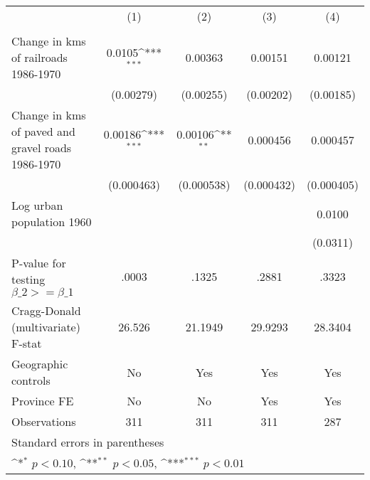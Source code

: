 {
\def\sym#1{\ifmmode^{#1}\else\(^{#1}\)\fi}
\begin{tabular}{l*{4}{c}}
\hline\hline
                &\multicolumn{1}{c}{(1)}&\multicolumn{1}{c}{(2)}&\multicolumn{1}{c}{(3)}&\multicolumn{1}{c}{(4)}\\
                &\multicolumn{1}{c}{}&\multicolumn{1}{c}{}&\multicolumn{1}{c}{}&\multicolumn{1}{c}{}\\
\hline
Change in kms of railroads 1986-1970&   0.0105\sym{***}&  0.00363         &  0.00151         &  0.00121         \\
                &(0.00279)         &(0.00255)         &(0.00202)         &(0.00185)         \\
[1em]
Change in kms of paved and gravel roads 1986-1970&  0.00186\sym{***}&  0.00106\sym{**} & 0.000456         & 0.000457         \\
                &(0.000463)         &(0.000538)         &(0.000432)         &(0.000405)         \\
[1em]
Log urban population 1960&                  &                  &                  &   0.0100         \\
                &                  &                  &                  & (0.0311)         \\
\hline
P-value for testing $\beta\_{2} >= \beta\_{1}$&    .0003         &    .1325         &    .2881         &    .3323         \\
Cragg-Donald (multivariate) F-stat&   26.526         &  21.1949         &  29.9293         &  28.3404         \\
Geographic controls&       No         &      Yes         &      Yes         &      Yes         \\
Province FE     &       No         &       No         &      Yes         &      Yes         \\
Observations    &      311         &      311         &      311         &      287         \\
\hline\hline
\multicolumn{5}{l}{\footnotesize Standard errors in parentheses}\\
\multicolumn{5}{l}{\footnotesize \sym{*} \(p<0.10\), \sym{**} \(p<0.05\), \sym{***} \(p<0.01\)}\\
\end{tabular}
}
